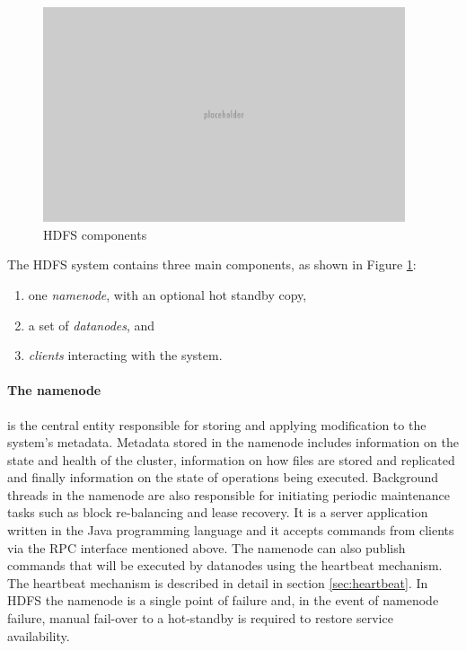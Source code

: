 \begin{figure}[h]
\caption{HDFS components}
\label{fig:hdfs-block-diagram}
\centering
\includegraphics[width=0.95\textwidth]{images/placeholder.png}
\end{figure}

The HDFS system contains three main components, as shown in Figure \ref{fig:hdfs-block-diagram}:
\begin{enumerate}
\item one \emph{namenode}, with an optional hot standby copy,
\item a set of \emph{datanodes}, and
\item \emph{clients} interacting with the system.
\end{enumerate}

\clearpage

\paragraph{The namenode} is the central entity responsible for storing and applying modification to the system's metadata.
Metadata stored in the namenode includes information on the state and health of the cluster, information on how files are stored and replicated and finally information on the state of operations being executed.
Background threads in the namenode are also responsible for initiating periodic maintenance tasks such as block re-balancing and lease recovery.
It is a server application written in the Java programming language and it accepts commands from clients via the RPC interface mentioned above.
The namenode can also publish commands that will be executed by datanodes using the heartbeat mechanism.
The heartbeat mechanism is described in detail in section \ref{sec:heartbeat}.
In HDFS the namenode is a single point of failure and, in the event of namenode failure, manual fail-over to a hot-standby is required to restore service availability.

